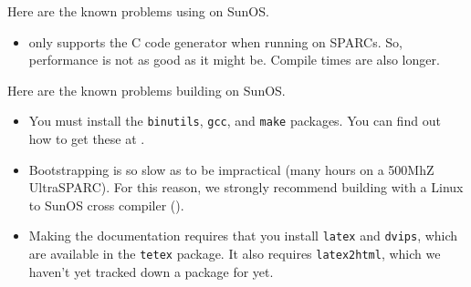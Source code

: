 
Here are the known problems using {\mlton} on SunOS.

\begin{itemize}

\item {\mlton} only supports the C code generator when running on
SPARCs. So, performance is not as good as it might be.  Compile times
are also longer.

\end{itemize}

Here are the known problems building {\mlton} on SunOS.

\begin{itemize}

\item You must install the {\tt binutils}, {\tt gcc}, and {\tt make}
packages.  You can find out how to get these at
.

\item Bootstrapping is so slow as to be impractical (many hours on a
500MhZ UltraSPARC).  For this reason, we strongly recommend building
with a Linux to SunOS cross compiler ().

\item Making the documentation requires that you install {\tt latex}
and {\tt dvips}, which are available in the {\tt tetex} package.  It
also requires {\tt latex2html}, which we haven't yet tracked down a
package for yet.

\end{itemize}
